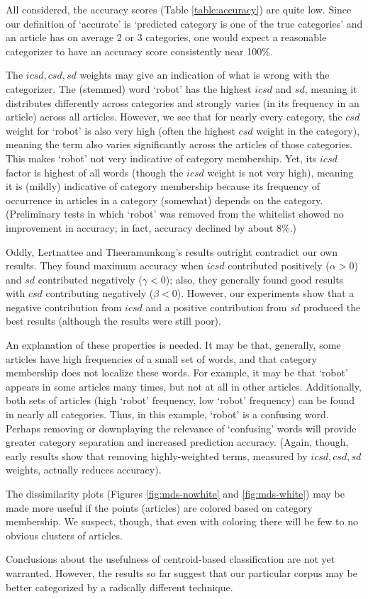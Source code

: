 \documentclass{article}
\begin{document}
All considered, the accuracy scores (Table \ref{table:accuracy}) are quite low.
Since our definition of `accurate' is `predicted category is one of the true
categories' and an article has on average 2 or 3 categories, one would expect
a reasonable categorizer to have an accuracy score consistently near 100\%.

The $icsd,csd,sd$ weights may give an indication of what is wrong with the
categorizer. The (stemmed) word `robot' has the highest $icsd$ and $sd$,
meaning it distributes differently across categories and strongly varies (in
its frequency in an article) across all articles. However, we see that for
nearly every category, the $csd$ weight for `robot' is also very high (often
the highest $csd$ weight in the category), meaning the term also varies
significantly across the articles of those categories. This makes `robot' not
very indicative of category membership. Yet, its $icsd$ factor is highest of
all words (though the $icsd$ weight is not very high), meaning it is (mildly)
indicative of category membership because its frequency of occurrence in
articles in a category (somewhat) depends on the category. (Preliminary tests
in which `robot' was removed from the whitelist showed no improvement in
accuracy; in fact, accuracy declined by about 8\%.)

Oddly, Lertnattee and Theeramunkong's results \cite{lertnattee2004effect}
outright contradict our own results. They found maximum accuracy when $icsd$
contributed positively ($\alpha>0$) and $sd$ contributed negatively
($\gamma<0$); also, they generally found good results with $csd$ contributing
negatively ($\beta<0$). However, our experiments show that a negative
contribution from $icsd$ and a positive contribution from $sd$ produced the
best results (although the results were still poor).

An explanation of these properties is needed. It may be that, generally, some
articles have high frequencies of a small set of words, and that category
membership does not localize these words. For example, it may be that `robot'
appears in some articles many times, but not at all in other articles.
Additionally, both sets of articles (high `robot' frequency, low `robot'
frequency) can be found in nearly all categories. Thus, in this example,
`robot' is a confusing word. Perhaps removing or downplaying the relevance of
`confusing' words will provide greater category separation and increased
prediction accuracy. (Again, though, early results show that removing
highly-weighted terms, measured by $icsd,csd,sd$ weights, actually reduces
accuracy).

The dissimilarity plots (Figures \ref{fig:mds-nowhite} and \ref{fig:mds-white})
may be made more useful if the points (articles) are colored based on category
membership. We suspect, though, that even with coloring there will be few to no
obvious clusters of articles.

Conclusions about the usefulness of centroid-based classification are not yet
warranted. However, the results so far suggest that our particular corpus may
be better categorized by a radically different technique.




\end{document}
